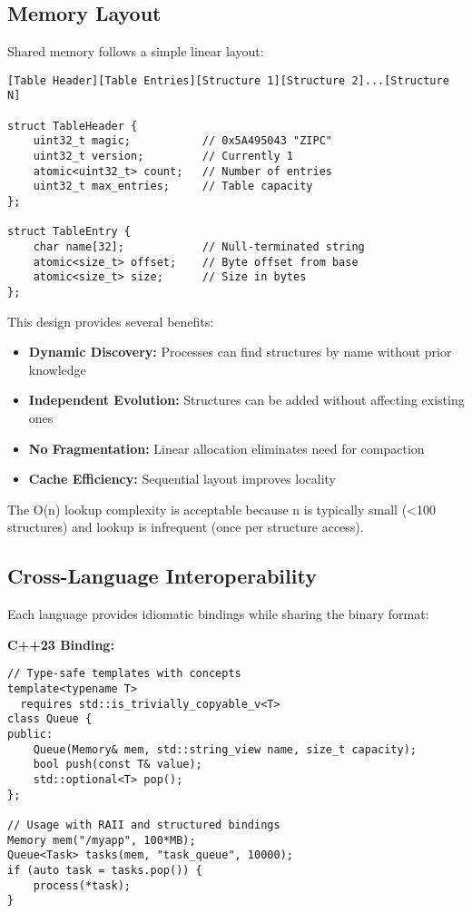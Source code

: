\documentclass[11pt]{article}
\begin{document}
\subsection{Memory Layout}

Shared memory follows a simple linear layout:

\begin{lstlisting}[caption={ZeroIPC Memory Layout}]
[Table Header][Table Entries][Structure 1][Structure 2]...[Structure N]

struct TableHeader {
    uint32_t magic;           // 0x5A495043 "ZIPC"
    uint32_t version;         // Currently 1
    atomic<uint32_t> count;   // Number of entries
    uint32_t max_entries;     // Table capacity
};

struct TableEntry {
    char name[32];            // Null-terminated string
    atomic<size_t> offset;    // Byte offset from base
    atomic<size_t> size;      // Size in bytes
};
\end{lstlisting}

This design provides several benefits:
\begin{itemize}
\item \textbf{Dynamic Discovery:} Processes can find structures by name without prior knowledge
\item \textbf{Independent Evolution:} Structures can be added without affecting existing ones
\item \textbf{No Fragmentation:} Linear allocation eliminates need for compaction
\item \textbf{Cache Efficiency:} Sequential layout improves locality
\end{itemize}

The O(n) lookup complexity is acceptable because n is typically small (<100 structures) and lookup is infrequent (once per structure access).

\subsection{Cross-Language Interoperability}

Each language provides idiomatic bindings while sharing the binary format:

\textbf{C++23 Binding:}
\begin{lstlisting}
// Type-safe templates with concepts
template<typename T>
  requires std::is_trivially_copyable_v<T>
class Queue {
public:
    Queue(Memory& mem, std::string_view name, size_t capacity);
    bool push(const T& value);
    std::optional<T> pop();
};

// Usage with RAII and structured bindings
Memory mem("/myapp", 100*MB);
Queue<Task> tasks(mem, "task_queue", 10000);
if (auto task = tasks.pop()) {
    process(*task);
}
\end{lstlisting}
\end{document}
